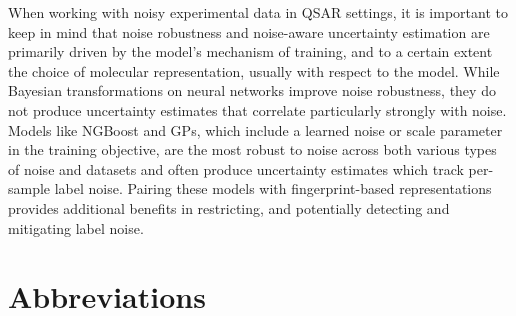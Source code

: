 \documentclass[pdflatex,sn-basic]{sn-jnl}%
\theoremstyle{thmstyleone}%
\theoremstyle{thmstyletwo}%
\theoremstyle{thmstylethree}%
\begin{document}
When working with noisy experimental data in QSAR settings, it is important to keep in mind that noise robustness and noise-aware uncertainty estimation are primarily driven by the model's mechanism of training, and to a certain extent the choice of molecular representation, usually with respect to the model. While Bayesian transformations on neural networks improve noise robustness, they do not produce uncertainty estimates that correlate particularly strongly with noise. Models like NGBoost and GPs, which include a learned noise or scale parameter in the training objective, are the most robust to noise across both various types of noise and datasets and often produce uncertainty estimates which track per-sample label noise. Pairing these models with fingerprint-based representations provides additional benefits in restricting, and potentially detecting and mitigating label noise. 

\section*{Abbreviations}
\end{document}

